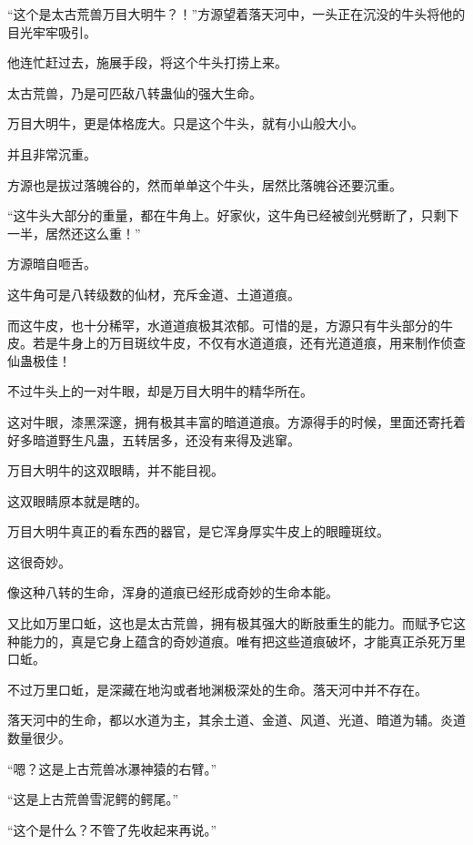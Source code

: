 
\begin{this_body}



“这个是太古荒兽万目大明牛？！”方源望着落天河中，一头正在沉没的牛头将他的目光牢牢吸引。

他连忙赶过去，施展手段，将这个牛头打捞上来。

太古荒兽，乃是可匹敌八转蛊仙的强大生命。

万目大明牛，更是体格庞大。只是这个牛头，就有小山般大小。

并且非常沉重。

方源也是拔过落魄谷的，然而单单这个牛头，居然比落魄谷还要沉重。

“这牛头大部分的重量，都在牛角上。好家伙，这牛角已经被剑光劈断了，只剩下一半，居然还这么重！”

方源暗自咂舌。

这牛角可是八转级数的仙材，充斥金道、土道道痕。

而这牛皮，也十分稀罕，水道道痕极其浓郁。可惜的是，方源只有牛头部分的牛皮。若是牛身上的万目斑纹牛皮，不仅有水道道痕，还有光道道痕，用来制作侦查仙蛊极佳！

不过牛头上的一对牛眼，却是万目大明牛的精华所在。

这对牛眼，漆黑深邃，拥有极其丰富的暗道道痕。方源得手的时候，里面还寄托着好多暗道野生凡蛊，五转居多，还没有来得及逃窜。

万目大明牛的这双眼睛，并不能目视。

这双眼睛原本就是瞎的。

万目大明牛真正的看东西的器官，是它浑身厚实牛皮上的眼瞳斑纹。

这很奇妙。

像这种八转的生命，浑身的道痕已经形成奇妙的生命本能。

又比如万里口蚯，这也是太古荒兽，拥有极其强大的断肢重生的能力。而赋予它这种能力的，真是它身上蕴含的奇妙道痕。唯有把这些道痕破坏，才能真正杀死万里口蚯。

不过万里口蚯，是深藏在地沟或者地渊极深处的生命。落天河中并不存在。

落天河中的生命，都以水道为主，其余土道、金道、风道、光道、暗道为辅。炎道数量很少。

“嗯？这是上古荒兽冰瀑神猿的右臂。”

“这是上古荒兽雪泥鳄的鳄尾。”

“这个是什么？不管了先收起来再说。”


\end{this_body}
